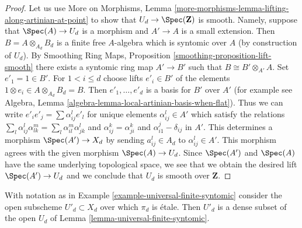 \begin{proof}
Let us use More on Morphisms, Lemma
\ref{more-morphisms-lemma-lifting-along-artinian-at-point}
to show that $U_d \to \Spec(\mathbf{Z})$ is smooth.
Namely, suppose that $\Spec(A) \to U_d$ is a morphism
and $A' \to A$ is a small extension. Then $B = A \otimes_{A_d} B_d$
is a finite free $A$-algebra which is syntomic over $A$
(by construction of $U_d$). By
Smoothing Ring Maps, Proposition \ref{smoothing-proposition-lift-smooth}
there exists a syntomic ring map $A' \to B'$ such that
$B \cong B' \otimes_{A'} A$. Set $e'_1 = 1 \in B'$. For $1 < i \leq d$
choose lifts $e'_i \in B'$ of the elements
$1 \otimes e_i \in A \otimes_{A_d} B_d = B$. Then $e'_1, \ldots, e'_d$
is a basis for $B'$ over $A'$ (for example see Algebra, Lemma
\ref{algebra-lemma-local-artinian-basis-when-flat}).
Thus we can write $e'_i e'_j = \sum \alpha_{ij}^l e'_l$ for unique
elements $\alpha_{ij}^l \in A'$ which satisfy the relations
$\sum_l \alpha_{ij}^l \alpha_{lk}^m = \sum_l \alpha_{il}^m \alpha _{jk}^l$
and $\alpha_{ij}^k = \alpha_{ji}^k$ and $\alpha_{i1}^j - \delta_{ij}$
in $A'$. This determines a morphism $\Spec(A') \to X_d$ by
sending $a_{ij}^l \in A_d$ to $\alpha_{ij}^l \in A'$. This morphism
agrees with the given morphism $\Spec(A) \to U_d$. Since $\Spec(A')$
and $\Spec(A)$ have the same underlying topological space, we see
that we obtain the desired lift $\Spec(A') \to U_d$ and we
conclude that $U_d$ is smooth over $\mathbf{Z}$.
\end{proof}

\begin{lemma}
\label{lemma-universal-finite-syntomic-etale}
With notation as in Example \ref{example-universal-finite-syntomic}
consider the open subscheme $U'_d \subset X_d$ over which
$\pi_d$ is \'etale. Then $U'_d$ is a dense subset of the
open $U_d$ of Lemma \ref{lemma-universal-finite-syntomic}.
\end{lemma}

